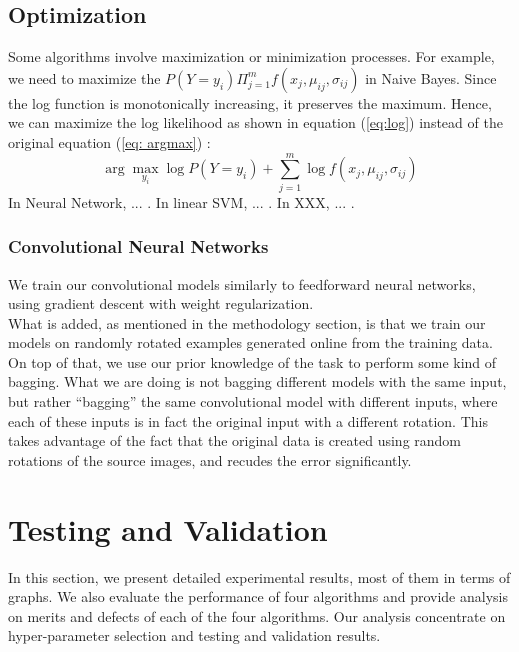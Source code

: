 \documentclass{acm_proc_article-sp}
\begin{document}
\subsection{Optimization}
Some algorithms involve maximization or minimization processes. For example, we need to maximize the $P(Y = y_i) \Pi_{j=1}^m f (x_j, \mu_{ij}, \sigma_{ij} )$ in Naive Bayes. Since the log function is monotonically increasing, it preserves the maximum. Hence, we can maximize the log likelihood as shown in equation (\ref{eq:log}) instead of the original equation (\ref{eq: argmax}) :
\begin{equation}
\arg \max_{y_i} \log P(Y = y_i) + \sum_{j=1}^m \log f (x_j, \mu_{ij}, \sigma_{ij} ) \label{eq:log}
\end{equation}
In Neural Network, ... . In linear SVM, ... . In XXX, ... .


\subsubsection{Convolutional Neural Networks}
We train our convolutional models similarly to feedforward neural networks, using gradient descent with weight regularization.\\
What is added, as mentioned in the methodology section, is that we train our models on randomly rotated examples generated online from the training data.
On top of that, we use our prior knowledge of the task to perform some kind of bagging. What we are doing is not bagging different models with the same input, but rather ``bagging'' the same convolutional model with different inputs, where each of these inputs is in fact the original input with a different rotation. This takes advantage of the fact that the original data is created using random rotations of the source images, and recudes the error significantly.






\section{Testing and Validation}
In this section, we present detailed experimental results, most of them in terms of graphs. We also evaluate the performance of four algorithms and provide analysis on merits and defects of each of the four algorithms. Our analysis concentrate on hyper-parameter selection and testing and validation results.
\end{document}
